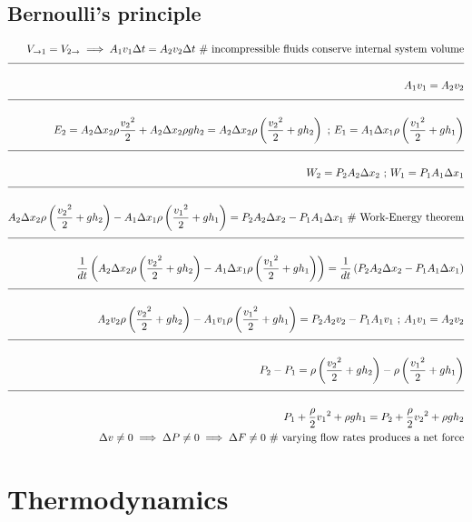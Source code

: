 \documentclass[a4paper]{article}
\newcommand{\eqComment}[1]{\text{  \# #1}}
\newcommand{\eqSep}{\text{ ;  }}
\newcommand{\n}{\\[1.5ex] \hline \nonumber \\[0ex]}
\begin{document}
\subsection{Bernoulli's principle}
\begin{tcolorbox}
\begin{align}
   V_{\to 1} = V_{2 \to} \implies A_1 v_1 \Delta t = A_2 v_2 \Delta t \eqComment{incompressible fluids conserve internal system volume}
\n A_1 v_1 = A_2 v_2
\n E_2 = A_2 \Delta x_2 \rho \frac{{v_2}^2}{2} + A_2 \Delta x_2 \rho g h_2 = A_2 \Delta x_2 \rho \left(\frac{{v_2}^2}{2} + g h_2\right) \eqSep E_1 = A_1 \Delta x_1 \rho \left(\frac{{v_1}^2}{2} + g h_1\right)
\n W_2 = P_2 A_2 \Delta x_2 \eqSep W_1 = P_1 A_1 \Delta x_1
\n A_2 \Delta x_2 \rho \left(\frac{{v_2}^2}{2} + g h_2\right) - A_1 \Delta x_1 \rho \left(\frac{{v_1}^2}{2} + g h_1\right) = P_2 A_2 \Delta x_2 - P_1 A_1 \Delta x_1 \eqComment{Work-Energy theorem}
\n \frac{1}{dt} \left(A_2 \Delta x_2 \rho \left(\frac{{v_2}^2}{2} + g h_2\right) - A_1 \Delta x_1 \rho \left(\frac{{v_1}^2}{2} + g h_1\right)\right) = \frac{1}{dt} \left(P_2 A_2 \Delta x_2 - P_1 A_1 \Delta x_1\right)
\n A_2 v_2 \rho \left(\frac{{v_2}^2}{2} + g h_2\right) - A_1 v_1 \rho \left(\frac{{v_1}^2}{2} + g h_1\right) = P_2 A_2 v_2 - P_1 A_1 v_1 \eqSep A_1 v_1 = A_2 v_2
\n P_2 - P_1 = \rho \left(\frac{{v_2}^2}{2} + g h_2\right) - \rho \left(\frac{{v_1}^2}{2} + g h_1\right)
\n P_1 + \frac{\rho}{2} {v_1}^2 + \rho g h_1 = P_2 + \frac{\rho}{2} {v_2}^2 + \rho g h_2
\\ \Delta v \neq 0 \implies \Delta P \neq 0 \implies \Delta F \neq 0 \eqComment{varying flow rates produces a net force}
\end{align}
\end{tcolorbox}

\section{Thermodynamics}
\end{document}
